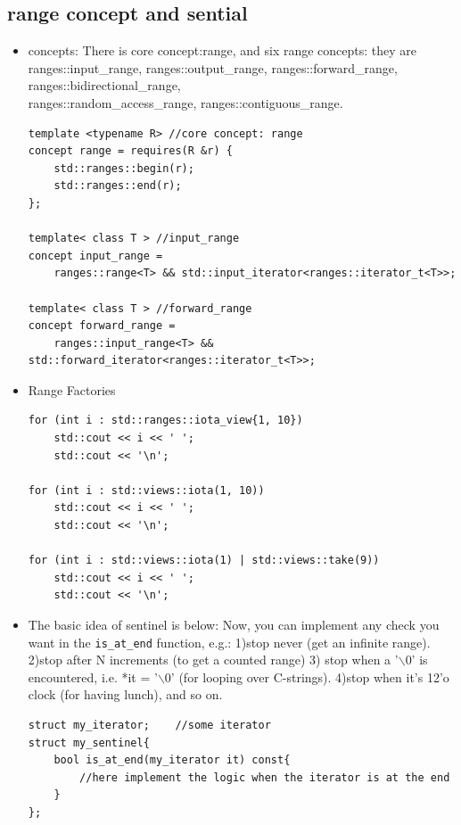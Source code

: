 \documentclass[a4paper,11pt,twoside]{book}
\begin{document}
\subsection{range concept and sential}
\begin{itemize}

		\item concepts: There is core concept:range, and six range concepts: they are ranges::input\_range, ranges::output\_range, ranges::forward\_range, ranges::bidirectional\_range, \\ 
		ranges::random\_access\_range, ranges::contiguous\_range.

\begin{lstlisting}
template <typename R> //core concept: range
concept range = requires(R &r) {
	std::ranges::begin(r);
	std::ranges::end(r);
};

template< class T > //input_range
concept input_range =
	ranges::range<T> && std::input_iterator<ranges::iterator_t<T>>;
	
template< class T > //forward_range
concept forward_range =
	ranges::input_range<T> && std::forward_iterator<ranges::iterator_t<T>>;	
\end{lstlisting}

		\item Range Factories 
\begin{lstlisting}
for (int i : std::ranges::iota_view{1, 10})
    std::cout << i << ' ';
    std::cout << '\n';

for (int i : std::views::iota(1, 10))
    std::cout << i << ' ';
    std::cout << '\n';
 
for (int i : std::views::iota(1) | std::views::take(9))
    std::cout << i << ' ';
    std::cout << '\n';
\end{lstlisting}


	\item The basic idea of sentinel is below:  Now, you can implement any check you want in the \texttt{is\_at\_end} function, e.g.: 1)stop never (get an infinite range). 2)stop after N increments (to get a counted range)
3) stop when a '$\backslash$0' is encountered, i.e. *it = '$\backslash$0' (for looping over C-strings). 4)stop when it's 12'o clock (for having lunch), and so on.

\begin{lstlisting}
struct my_iterator;    //some iterator
struct my_sentinel{
	bool is_at_end(my_iterator it) const{
		//here implement the logic when the iterator is at the end
	}
};


\end{lstlisting}
\end{itemize}
\end{document}
